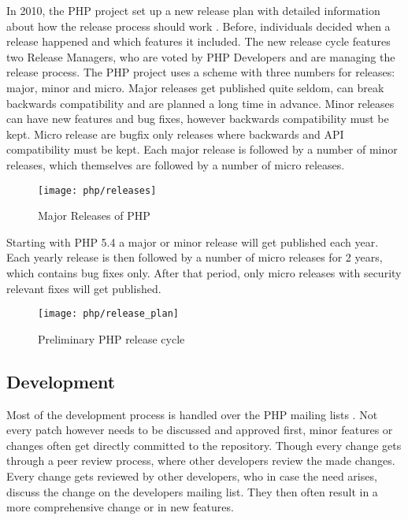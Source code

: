 In 2010, the PHP project set up a new release plan with detailed information
about how the release process should work \cite{PHPRelease}. Before,
individuals decided when a release happened and which features it included. The
new release cycle features two Release Managers, who are voted by PHP
Developers and are managing the release process. The PHP project uses a scheme
with three numbers for releases: major, minor and micro. Major releases get
published quite seldom, can break backwards compatibility and are planned a
long time in advance. Minor releases can have new features and bug fixes,
however backwards compatibility must be kept. Micro release are bugfix only
releases where backwards and API compatibility must be kept. Each major release
is followed by a number of minor releases, which themselves are followed by a
number of micro releases.

\begin{figure}[htbp]
  \centering
  \texttt{[image: php/releases]}
  \caption{Major Releases of PHP}
\end{figure}

Starting with PHP 5.4 a major or minor release will get published each year. Each
yearly release is then followed by a number of micro releases for 2 years,
which contains bug fixes only. After that period, only micro releases with
security relevant fixes will get published.

\begin{figure}[htbp]
  \centering
  \texttt{[image: php/release\_plan]}
  \caption{Preliminary PHP release cycle}
\end{figure}


\subsection{Development} %

Most of the development process is handled over the PHP mailing lists
\cite{PHPRelease,Magnusson2010,PHPVoting}. Not every patch however needs to be
discussed and approved first, minor features or changes often get directly
committed to the repository. Though every change gets through a peer review
process, where other developers review the made changes. Every change gets
reviewed by other developers, who in case the need arises, discuss the change
on the developers mailing list. They then often result in a more comprehensive
change or in new features.

